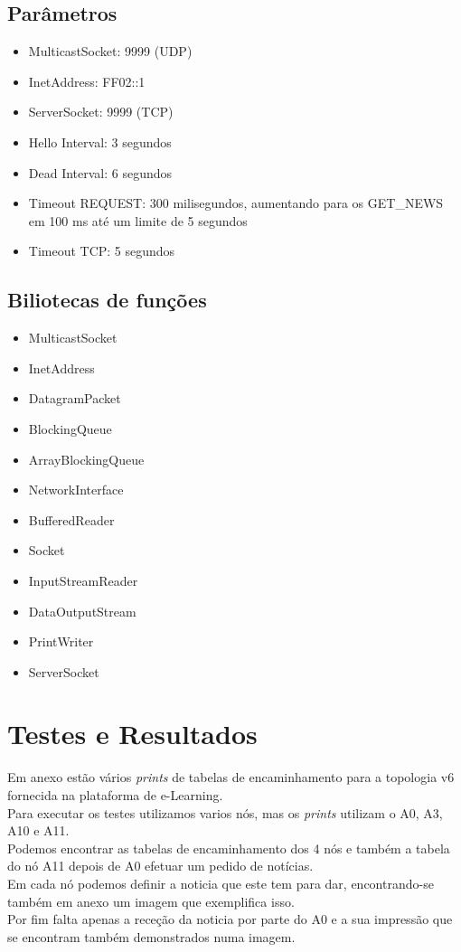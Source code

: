 \documentclass{llncs}
\begin{document}
\subsection{Parâmetros}

\begin{itemize}
    \item MulticastSocket: 9999 (UDP)
    \item InetAddress: FF02::1
    \item ServerSocket: 9999 (TCP)
    \item Hello Interval: 3 segundos
    \item Dead Interval: 6 segundos
    \item Timeout REQUEST: 300 milisegundos, aumentando para os GET\_NEWS em 100 ms até um limite de 5 segundos
    \item Timeout TCP: 5 segundos
\end{itemize}

\subsection{Biliotecas de funções}

\begin{itemize}
    \item MulticastSocket
    \item InetAddress
    \item DatagramPacket
    \item BlockingQueue
    \item ArrayBlockingQueue
    \item NetworkInterface
    \item BufferedReader
    \item Socket
    \item InputStreamReader
    \item DataOutputStream
    \item PrintWriter
    \item ServerSocket
\end{itemize}

\section{Testes e Resultados}

Em anexo estão vários \emph{prints} de tabelas de encaminhamento para a topologia v6 fornecida na plataforma de e-Learning.\\

Para executar os testes utilizamos varios nós, mas os \emph{prints} utilizam o A0, A3, A10 e A11.\\
Podemos encontrar as tabelas de encaminhamento dos 4 nós e também a tabela do nó A11 depois de A0 efetuar um pedido de notícias.\\
Em cada nó podemos definir a noticia que este tem para dar, encontrando-se também em anexo um imagem que exemplifica isso.\\
Por fim falta apenas a receção da noticia por parte do A0 e a sua impressão que se encontram também demonstrados numa imagem.
\end{document}
